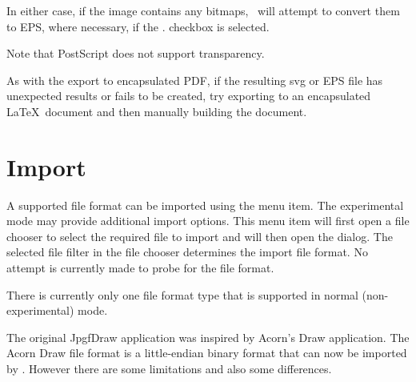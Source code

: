 
In either case, if the image contains any
\glspl{bitmap}, \FlowframTk\ will attempt to convert
them to EPS, where necessary, if the .
checkbox is selected.

\begin{important}
Note that PostScript does not support transparency.
\end{important}

As with the export to encapsulated PDF, if the resulting \gls{svg} or EPS
file has unexpected results or fails to be created, try exporting to
an encapsulated \LaTeX\ document and then manually building the
document.

\section{Import}\label{sec:importimage}


A supported file format can be imported using the 
menu item. The experimental mode may provide additional import options.
This menu item will first open a file chooser to select the required
file to import and will then open the  dialog.
The selected file filter in the file chooser determines the import
file format. No attempt is currently made to probe for the file format.

\begin{information}
There is currently only one file format type that is supported in
normal (non-experimental) mode.
\end{information}

The original \gls{JpgfDraw} application was inspired by Acorn's Draw
application. The Acorn Draw file format is a little-endian binary format that can
now be imported by \FlowframTk. However there are some limitations
and also some differences.

